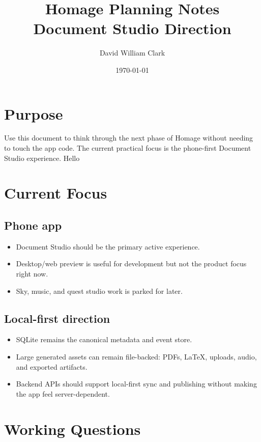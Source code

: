 \documentclass[11pt]{article}
\author{David William Clark}
\date{\today}
\title{Homage Planning Notes\\\medskip
\large Document Studio Direction}
\begin{document}
\maketitle
\setcounter{tocdepth}{2}
\tableofcontents

\section{Purpose}
\label{sec:org96b042a}

Use this document to think through the next phase of Homage without needing to
touch the app code. The current practical focus is the phone-first Document
Studio experience. Hello
\section{Current Focus}
\label{sec:org2e0d8ab}

\subsection{Phone app}
\label{sec:org8f5f7aa}

\begin{itemize}
\item Document Studio should be the primary active experience.
\item Desktop/web preview is useful for development but not the product focus right now.
\item Sky, music, and quest studio work is parked for later.
\end{itemize}
\subsection{Local-first direction}
\label{sec:org86b7367}

\begin{itemize}
\item SQLite remains the canonical metadata and event store.
\item Large generated assets can remain file-backed: PDFs, \LaTeX{}, uploads, audio, and exported artifacts.
\item Backend APIs should support local-first sync and publishing without making the app feel server-dependent.
\end{itemize}
\section{Working Questions}
\label{sec:orgb408aeb}
\end{document}
